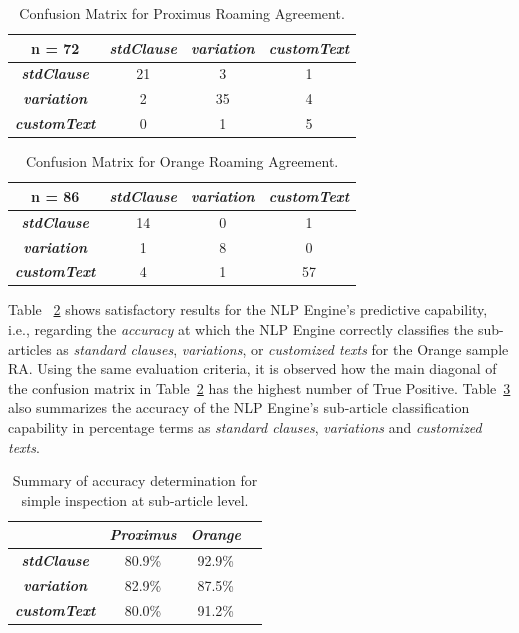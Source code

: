 \begin{table}[htbp]
\caption{Confusion Matrix for Proximus Roaming Agreement.}
\begin{center}
\begin{tabular}{|c|c|c|c|}
\hline
\textbf{n = 72} & \textbf{\textit{stdClause}}& \textbf{\textit{variation}}& \textbf{\textit{customText}} \\
\hline
\textbf{\textit{stdClause}}& 21 & 3 & 1 \\
\hline
\textbf{\textit{variation}}& 2 & 35 & 4 \\
\hline
\textbf{\textit{customText}}& 0 & 1 & 5 \\
\hline
\end{tabular}
\label{table1}
\end{center}
\end{table}

\begin{table}[htbp]
\caption{Confusion Matrix for Orange Roaming Agreement.}
\begin{center}
\begin{tabular}{|c|c|c|c|}
\hline
\textbf{n = 86} & \textbf{\textit{stdClause}}& \textbf{\textit{variation}}& \textbf{\textit{customText}} \\
\hline
\textbf{\textit{stdClause}}& 14 & 0 & 1 \\
\hline
\textbf{\textit{variation}}& 1 & 8 & 0 \\
\hline
\textbf{\textit{customText}}& 4 & 1 & 57 \\
\hline
\end{tabular}
\label{table2}
\end{center}
\end{table}

Table ~\ref{table2} shows satisfactory results for the NLP Engine's predictive capability, i.e., regarding the \textit{accuracy} at which the NLP Engine correctly classifies the sub-articles as \textit{standard clauses}, \textit{variations}, or \textit{customized texts} for the Orange sample RA. Using the same evaluation criteria, it is observed how the main diagonal of the confusion matrix in Table~\ref{table2} has the highest number of True Positive. Table~\ref{table3} also summarizes the accuracy of the NLP Engine's sub-article classification capability in percentage terms as \textit{standard clauses}, \textit{variations} and \textit{customized texts}.

\begin{table}[htbp]
\caption{Summary of accuracy determination for simple inspection at sub-article level.}
\begin{center}
\begin{tabular}{|c|c|c|c|}
\hline
\textbf{} & \textbf{\textit{Proximus}}& \textbf{\textit{Orange}} \\
\hline
\textbf{\textit{stdClause}}& 80.9\% & 92.9\% \\
\hline
\textbf{\textit{variation}}& 82.9\% & 87.5\% \\
\hline
\textbf{\textit{customText}}& 80.0\% & 91.2\% \\
\hline
\end{tabular}
\label{table3}
\end{center}
\end{table}

